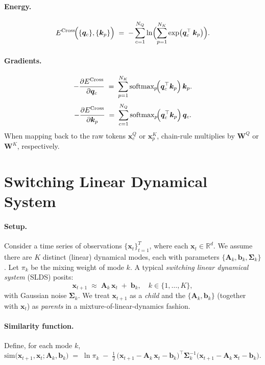 \documentclass{article}
\begin{document}
\paragraph{Energy.}
\begin{equation}
E^{\mathrm{Cross}}\!\Bigl(\{\bm{q}_c\}, \{\bm{k}_p\}\Bigr)
\;=\;
-\sum_{c=1}^{N_Q}
\ln \Bigl(\sum_{p=1}^{N_K}
\exp\bigl(\bm{q}_c^\top\,\bm{k}_p\bigr)\Bigr).
\end{equation}

\paragraph{Gradients.}
\begin{equation}
-\frac{\partial E^{\mathrm{Cross}}}{\partial \bm{q}_c}
\;=\;
\sum_{p=1}^{N_K}
\text{softmax}_{p}\!\Bigl(\bm{q}_c^\top \bm{k}_p \Bigr)\,
\bm{k}_p.
\end{equation}
\begin{equation}
-\frac{\partial E^{\mathrm{Cross}}}{\partial \bm{k}_p}
\;=\;
\sum_{c=1}^{N_Q}
\text{softmax}_{p}\!\Bigl(\bm{q}_c^\top \bm{k}_p \Bigr)\,
\bm{q}_c.
\end{equation}
When mapping back to the raw tokens \(\bm{x}^Q_c\) or \(\bm{x}^K_p\), chain-rule multiplies by \(\bm{W}^Q\) or \(\bm{W}^K\), respectively.


\section{Switching Linear Dynamical System}

\paragraph{Setup.}
Consider a time series of observations \(\{\bm{x}_t\}_{t=1}^T\), where each \(\bm{x}_t \in \mathbb{R}^d\).  
We assume there are \(K\) distinct (linear) dynamical modes, each with parameters \(\{\bm{A}_k, \bm{b}_k, \bm{\Sigma}_k\}\). Let \(\pi_k\) be the mixing weight of mode \(k\).  A typical \emph{switching linear dynamical system} (SLDS) posits:
\[
\bm{x}_{t+1}
\;\approx\;
\bm{A}_k\,\bm{x}_t \;+\; \bm{b}_k,
\quad
k \in \{1,\dots,K\},
\]
with Gaussian noise \(\bm{\Sigma}_k\).  
We treat \(\bm{x}_{t+1}\) as a \emph{child} and the \(\{\bm{A}_k, \bm{b}_k\}\) (together with \(\bm{x}_t\)) as \emph{parents} in a mixture-of-linear-dynamics fashion.

\paragraph{Similarity function.}
Define, for each mode \(k\),
\[
\mathrm{sim}\bigl(\bm{x}_{t+1}, \bm{x}_t; \bm{A}_k, \bm{b}_k\bigr)
\;=\;
\ln \pi_k
\;-\;
\tfrac12\,\bigl(\bm{x}_{t+1} - \bm{A}_k\,\bm{x}_t - \bm{b}_k\bigr)^\top
\bm{\Sigma}_k^{-1}
\bigl(\bm{x}_{t+1} - \bm{A}_k\,\bm{x}_t - \bm{b}_k\bigr).
\]
\end{document}
